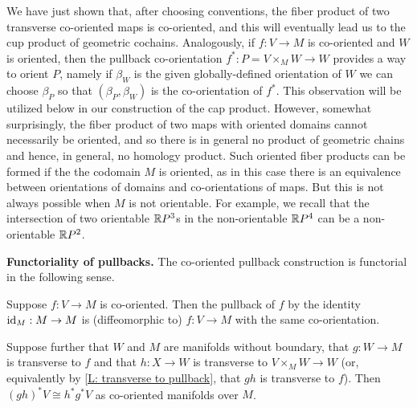 \begin{remark}\label{R: what products exist}
	We have just shown that, after choosing conventions, the fiber product of two transverse co-oriented maps is co-oriented, and this will eventually lead us to the cup product of geometric cochains.
	Analogously, if $f \colon V \to M$ is co-oriented and $W$ is oriented, then the pullback co-orientation $f^*:P=V\times_MW\to W$ provides a way to orient $P$, namely if $\beta_W$ is the given globally-defined orientation of $W$ we can choose $\beta_P$ so that $(\beta_P,\beta_W)$ is the co-orientation of $f^*$.
	This observation will be utilized below in our construction of the cap product.
	However, somewhat surprisingly, the fiber product of two maps with oriented domains cannot necessarily be oriented, and so there is in general no product of geometric chains and hence, in general, no homology product.
	Such oriented fiber products can be formed if the the codomain $M$ is oriented, as in this case there is an equivalence between orientations of domains and co-orientations of maps.
	But this is not always possible when $M$ is not orientable.
	For example, we recall that the intersection of two orientable $\mathbb{R} P^3$s in the non-orientable $\mathbb{R} P^4$ can be a non-orientable $\mathbb{R} P^2$.
\end{remark}

\textbf{Functoriality of pullbacks.} The co-oriented pullback construction is functorial in the following sense.

\begin{proposition}\label{P: pullback functoriality}
	Suppose $f \colon V \to M$ is co-oriented.
	Then the pullback of $f$ by the identity $\mathrm{id}_M:M\to M$ is (diffeomorphic to) $f \colon V \to M$ with the same co-orientation.

	Suppose further that $W$ and $M$ are manifolds without boundary, that $g \colon W \to M$ is transverse to $f$ and that $h:X\to W$ is transverse to $V\times_M W\to W$ (or, equivalently by \cref{L: transverse to pullback}, that $gh$ is transverse to $f$).
	Then $(gh)^*V\cong h^*g^*V$ as co-oriented manifolds over $M$.
\end{proposition}

